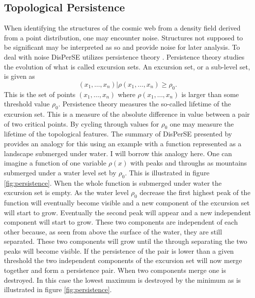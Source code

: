 \subsection{Topological Persistence}\label{sec:persistence}
When identifying the structures of the cosmic web from a density field derived
from a point distribution, one may
encounter noise. Structures not supposed to be significant may be interpreted as
so and provide noise for later analysis. To deal with noise DisPerSE utilizes
persistence theory \cite{persistence}. Persistence theory studies the evolution
of what is called excursion sets. An excursion set, or a sub-level set, is given as
\begin{equation}
    (x_1,\dots, x_n)\vert\rho(x_1,\dots, x_n)\geq\rho_0.
\end{equation}
This is the set of points $(x_1,\dots, x_n)$ where $\rho(x_1,\dots, x_n)$ is
larger than some threshold value $\rho_0$. Persistence theory measures the so-called
lifetime of the excursion set. This is a measure of the absolute
difference in value between a pair of two critical points. By cycling through
values for $\rho_0$ one may measure the lifetime of the topological features.
The summary of DisPerSE presented by \cite{Alexhothesis} provides an analogy for this using
an example with a function represented as a landscape submerged under water. I will borrow this analogy here.
One can imagine a function of one variable $\rho(x)$ with peaks and throughs as
mountains submerged under a water level set by $\rho_0$. This is illustrated in
figure \ref{fig:persistence}.
When the whole function is submerged under water the excursion set is empty. As
the water level $\rho_0$ decrease the first highest peak of the function will
eventually become visible and a new component of the excursion set will start to
grow. Eventually the second peak will appear and a new independent component
will start to grow. These two components are independent of each other because,
as seen from above the surface of the water, they are still separated. These two
components will grow until the through separating the two peaks will become
visible. If the persistence of the pair is lower than a given threshold the two independent components of the excursion set will now merge
together and form a persistence pair. When two components merge one is
destroyed. In this case the lowest maximum is destroyed by the minimum as is
illustrated in figure \ref{fig:persistence}.\\

